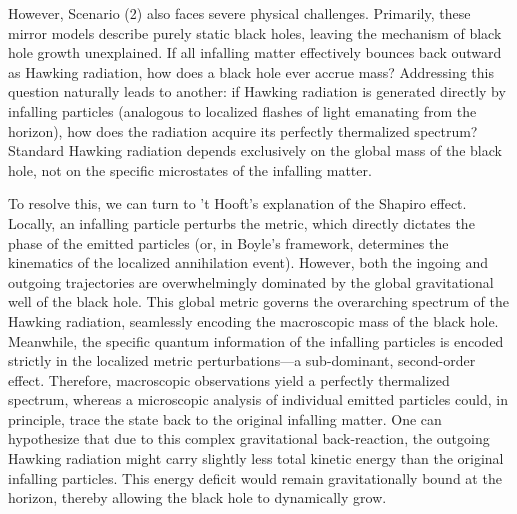 However, Scenario (2) also faces severe physical challenges. Primarily, these mirror models describe purely static black holes, leaving the mechanism of black hole growth unexplained. If all infalling matter effectively bounces back outward as Hawking radiation, how does a black hole ever accrue mass? Addressing this question naturally leads to another: if Hawking radiation is generated directly by infalling particles (analogous to localized flashes of light emanating from the horizon), how does the radiation acquire its perfectly thermalized spectrum? Standard Hawking radiation depends exclusively on the global mass of the black hole, not on the specific microstates of the infalling matter. 

To resolve this, we can turn to 't Hooft's explanation of the Shapiro effect. Locally, an infalling particle perturbs the metric, which directly dictates the phase of the emitted particles (or, in Boyle's framework, determines the kinematics of the localized annihilation event). However, both the ingoing and outgoing trajectories are overwhelmingly dominated by the global gravitational well of the black hole. This global metric governs the overarching spectrum of the Hawking radiation, seamlessly encoding the macroscopic mass of the black hole. Meanwhile, the specific quantum information of the infalling particles is encoded strictly in the localized metric perturbations—a sub-dominant, second-order effect. Therefore, macroscopic observations yield a perfectly thermalized spectrum, whereas a microscopic analysis of individual emitted particles could, in principle, trace the state back to the original infalling matter. One can hypothesize that due to this complex gravitational back-reaction, the outgoing Hawking radiation might carry slightly less total kinetic energy than the original infalling particles. This energy deficit would remain gravitationally bound at the horizon, thereby allowing the black hole to dynamically grow.

 

\printbibliography[heading=subbibintoc, title={References for Chapter \thechapter}]